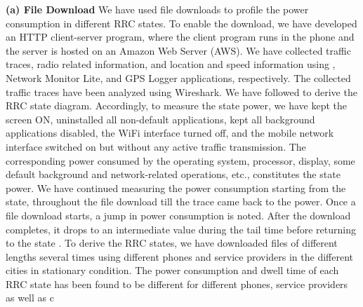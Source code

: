 {\textbf{(a) File Download}} We have used file downloads to profile the power consumption in different RRC states. To enable the download, we have developed  an HTTP client-server program, where the client program runs in the phone and the server  is hosted on an Amazon Web Server (AWS). We have collected traffic traces, radio related information, and location and speed information using , Network Monitor Lite, and GPS Logger applications, respectively. The collected traffic traces have been analyzed using Wireshark. We have followed \cite{Yang2018} to derive  the RRC state diagram. Accordingly, to measure the  state power, we have kept the screen ON, uninstalled all non-default applications, kept all background applications disabled, the WiFi interface turned off, and the mobile network interface switched on but without any active traffic transmission. The corresponding power consumed by the operating system, processor, display, some default background and network-related operations, etc., constitutes the  state power.  We have continued measuring the power consumption starting from the  state, throughout the file download till the trace came back to the  power. Once a file download starts, a jump in power consumption is noted. After the download completes, it drops to an intermediate value during the tail time before returning to the  state \cite{Yang2018}. To derive the RRC states, we have downloaded files of different lengths several times using different phones and service providers  in the different cities in stationary condition. The power consumption and dwell time of each RRC state has been found to be different for different phones, service providers as well as c


